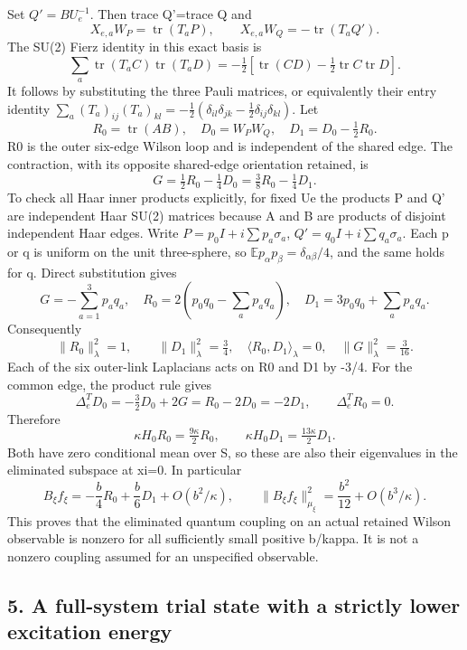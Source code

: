 \documentclass[
  11pt,
]{article}
\begin{document}
Set \(Q'=BU_e^{-1}\). Then trace Q'=trace Q and \[
 X_{e,a}W_P=\operatorname{tr}(T_aP),\qquad
 X_{e,a}W_Q=-\operatorname{tr}(T_aQ').
\] The SU(2) Fierz identity in this exact basis is \[
 \sum_a\operatorname{tr}(T_aC)\operatorname{tr}(T_aD)
 =-\tfrac12[\operatorname{tr}(CD)-\tfrac12\operatorname{tr}C\operatorname{tr}D].
\] It follows by substituting the three Pauli matrices, or equivalently
their entry identity \(\sum_a(T_a)_{ij}(T_a)_{kl}
=-\tfrac12(\delta_{il}\delta_{jk}-\tfrac12\delta_{ij}\delta_{kl})\). Let
\[
 R_0=\operatorname{tr}(AB),\quad D_0=W_PW_Q,\quad
 D_1=D_0-\tfrac12R_0.
\] R0 is the outer six-edge Wilson loop and is independent of the shared
edge. The contraction, with its opposite shared-edge orientation
retained, is \[
 G=\tfrac12R_0-\tfrac14D_0
   =\tfrac38R_0-\tfrac14D_1.
\] To check all Haar inner products explicitly, for fixed Ue the
products P and Q' are independent Haar SU(2) matrices because A and B
are products of disjoint independent Haar edges. Write
\(P=p_0I+i\sum p_a\sigma_a\), \(Q'=q_0I+i\sum q_a\sigma_a\). Each p or q
is uniform on the unit three-sphere, so
\(\mathbb E p_\alpha p_\beta=\delta_{\alpha\beta}/4\), and the same
holds for q. Direct substitution gives \[
 G=-\sum_{a=1}^3p_aq_a,\quad
 R_0=2(p_0q_0-\sum_ap_aq_a),\quad
 D_1=3p_0q_0+\sum_ap_aq_a.
\] Consequently \[
 \|R_0\|_\lambda^2=1,\qquad \|D_1\|_\lambda^2=\tfrac34,
 \quad\langle R_0,D_1\rangle_\lambda=0,
 \quad\|G\|_\lambda^2=\tfrac3{16}.
\] Each of the six outer-link Laplacians acts on R0 and D1 by -3/4. For
the common edge, the product rule gives \[
 \Delta_e^T D_0=-\tfrac32D_0+2G=R_0-2D_0=-2D_1,
 \qquad \Delta_e^T R_0=0.
\] Therefore \[
 \kappa H_0R_0=\tfrac{9\kappa}{2}R_0,\qquad
 \kappa H_0D_1=\tfrac{13\kappa}{2}D_1.
\] Both have zero conditional mean over S, so these are also their
eigenvalues in the eliminated subspace at xi=0. In particular \[
 B_\xi f_\xi=-\frac b4R_0+\frac b6D_1+O(b^2/\kappa),\qquad
 \|B_\xi f_\xi\|_{\mu_\xi}^2
      =\frac{b^2}{12}+O(b^3/\kappa).
\] This proves that the eliminated quantum coupling on an actual
retained Wilson observable is nonzero for all sufficiently small
positive b/kappa. It is not a nonzero coupling assumed for an
unspecified observable.

\subsection{5. A full-system trial state with a strictly lower
excitation
energy}\label{a-full-system-trial-state-with-a-strictly-lower-excitation-energy}
\end{document}
